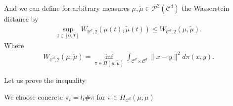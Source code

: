 \begin{definition}\label{c_d_wasserstein}
And we can define for arbitrary measures $\mu ,\tilde{\mu } \in  \mathcal{P}^2(\mathcal{C}^{d} ) $ the Wasserstein distance by
\begin{align*}
  \sup_{t \in  [0,T]} W_{\mathbb{R}^{d},2 }(\mu(t),\tilde{\mu }(t) ) \le  W_{\mathcal{C}^{d},2 } (\mu ,\tilde{\mu } )
.\end{align*}
Where 
\begin{align*}
  W_{\mathcal{C}^{d},2 }(\mu ,\tilde{\mu } ) = \inf_{\pi  \in  \Pi(\mu ,\tilde{\mu } )} \int_{\mathcal{C}^{d} \times  \mathcal{C}^{d}  } \|x-y \|^2 d\pi(x,y)
.\end{align*}
\end{definition}
\begin{corollary}
  Let us prove the inequality
\end{corollary}
We choose concrete $\pi_t =  l_t \# \pi $ for $\pi  \in  \Pi_{\mathcal{C}^{d}  }(\mu ,\tilde{\mu } )$
